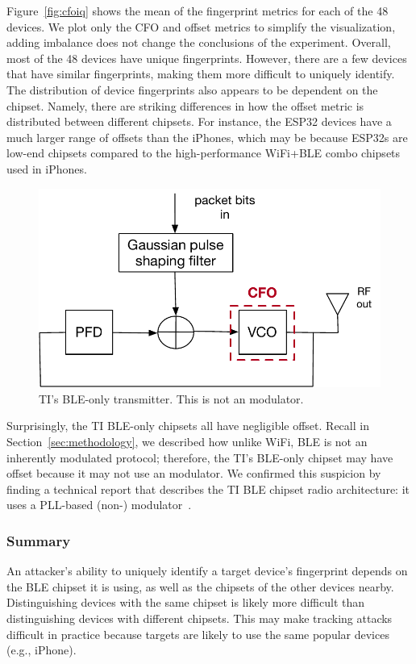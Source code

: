 Figure~\ref{fig:cfoiq} shows the mean of the fingerprint metrics for each of
the 48 devices. We plot only the CFO and \iq offset metrics to simplify the
visualization, adding \iq imbalance does not change the conclusions of the
experiment. Overall, most of the 48 devices have unique fingerprints. However, there
are a few devices that have similar fingerprints, making them more difficult to uniquely identify. The distribution of
device fingerprints also appears to be dependent on the chipset.
Namely, there are striking differences in how the \iq offset metric is
distributed between different chipsets.
For instance, the ESP32 devices have a much
larger range of \iq offsets than the iPhones, which may be
because ESP32s are low-end chipsets compared to the
high-performance WiFi+BLE combo chipsets used in iPhones.

\begin{figure}
    \centering
    \captionsetup{justification=centering}
    \includegraphics[width = 0.6\linewidth]{bletracking/plots/dpll.pdf} 
    \caption{TI's BLE-only transmitter. This is not an \iq modulator.}
    \label{fig:dpll}
\end{figure}

Surprisingly, the TI BLE-only chipsets all have negligible \iq offset.
Recall in Section~\ref{sec:methodology}, we described how unlike WiFi, BLE is
not an inherently \iq modulated protocol; therefore, the TI's BLE-only
chipset may have \iq offset because it may not use an \iq modulator.  We
confirmed this suspicion by finding a technical report that describes the
TI BLE chipset radio architecture: it uses a PLL-based 
(non-\iq) modulator~\cite{pllarchBLE}.

\subsubsection*{Summary} An attacker's ability to uniquely identify a target device's 
fingerprint depends on the BLE chipset it is using, as well as the
chipsets of the other devices nearby. Distinguishing devices
with the same chipset is likely more difficult than distinguishing 
devices with different chipsets. This may make tracking 
attacks difficult in practice because targets are likely to use the same popular devices (e.g.,
iPhone). %

